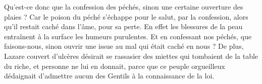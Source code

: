 Qu’est-ce donc que la confession des péchés, sinon une certaine ouverture des plaies ? Car le poison du péché s’échappe pour le salut, par la confession, alors qu’il restait caché dans l’âme, pour sa perte. En effet les blessures de la peau entraînent à la surface les humeurs purulentes. Et en confessant nos péchés, que faisons-nous, sinon ouvrir une issue au mal qui était caché en nous ? De plus, Lazare couvert d'ulcères désirait se rassasier des miettes qui tombaient de la table du riche, et personne ne lui en donnait, parce que ce peuple orgueilleux dédaignait d’admettre aucun des Gentils à la connaissance de la loi.
